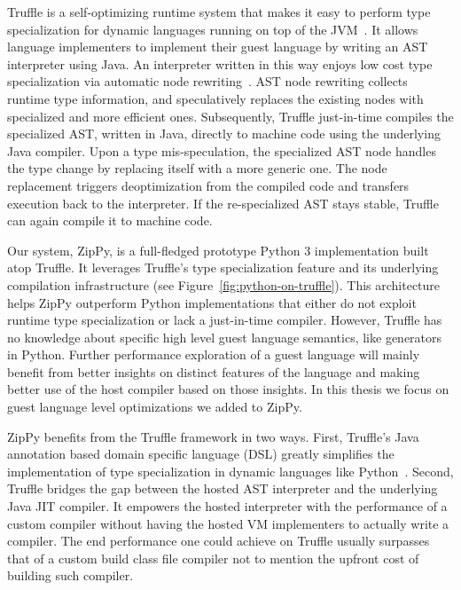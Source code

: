 Truffle is a self-optimizing runtime system that makes it easy to perform type specialization for dynamic languages running on top of the JVM~\cite{Wurthinger+13}.
It allows language implementers to implement their guest language by writing an AST interpreter using Java.
An interpreter written in this way enjoys low cost type specialization via automatic node rewriting~\cite{Wurthinger+12,Brunthaler2010inca,Brunthaler2010quickening}.
AST node rewriting collects runtime type information, and speculatively replaces the existing nodes with specialized and more efficient ones.
Subsequently, Truffle just-in-time compiles the specialized AST, written in Java, directly to machine code using the underlying Java compiler.
Upon a type mis-speculation, the specialized AST node handles the type change by replacing itself with a more generic one.
The node replacement triggers deoptimization from the compiled code and transfers execution back to the interpreter.
If the re-specialized AST stays stable, Truffle can again compile it to machine code.

Our system, ZipPy, is a full-fledged prototype Python 3 implementation built atop Truffle.
It leverages Truffle's type specialization feature and its underlying compilation infrastructure (see Figure~\ref{fig:python-on-truffle}).
This architecture helps ZipPy outperform Python implementations that either do not exploit runtime type specialization or lack a just-in-time compiler.
However, Truffle has no knowledge about specific high level guest language semantics, like generators in Python.
Further performance exploration of a guest language will mainly benefit from better insights on distinct features of the language and
making better use of the host compiler based on those insights.
In this thesis we focus on guest language level optimizations we added to ZipPy.

ZipPy benefits from the Truffle framework in two ways.
First, Truffle's Java annotation based domain specific language (DSL) greatly simplifies the implementation of type specialization in dynamic languages like Python~\cite{Humer+2014}.
Second, Truffle bridges the gap between the hosted AST interpreter and the underlying Java JIT compiler.
It empowers the hosted interpreter with the performance of a custom compiler without having the hosted VM implementers to actually write a compiler.
The end performance one could achieve on Truffle usually surpasses that of a custom build class file compiler not to mention the upfront cost of building such compiler.

